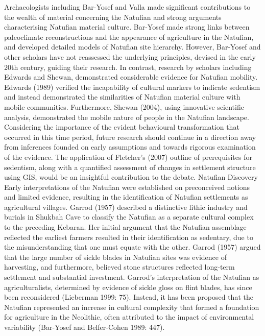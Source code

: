\documentclass[%
	]{ijsra}
\begin{document}
Archaeologists including Bar-Yosef and Valla made significant contributions to the wealth of material concerning the Natufian and strong arguments characterising Natufian material culture. Bar-Yosef made strong links between paleoclimate reconstructions and the appearance of agriculture in the Natufian, and developed detailed models of Natufian site hierarchy. However, Bar-Yosef and other scholars have not reassessed the underlying principles, devised in the early 20th century, guiding their research. In contrast, research by scholars including Edwards and Shewan, demonstrated considerable evidence for Natufian mobility. Edwards (1989) verified the incapability of cultural markers to indicate sedentism and instead demonstrated the similarities of Natufian material culture with mobile communities. Furthermore, Shewan (2004), using innovative scientific analysis, demonstrated the mobile nature of people in the Natufian landscape. Considering the importance of the evident behavioural transformation that occurred in this time period, future research should continue in a direction away from inferences founded on early assumptions and towards rigorous examination of the evidence. The application of Fletcher’s (2007) outline of prerequisites for sedentism, along with a quantified assessment of changes in settlement structure using GIS, would be an insightful contribution to the debate.
Natufian Discovery 
Early interpretations of the Natufian were established on preconceived notions and limited evidence, resulting in the identification of Natufian settlements as agricultural villages. Garrod (1957) described a distinctive lithic industry and burials in Shukbah Cave to classify the Natufian as a separate cultural complex to the preceding Kebaran. Her initial argument that the Natufian assemblage reflected the earliest farmers resulted in their identification as sedentary, due to the misunderstanding that one must equate with the other. Garrod (1957) argued that the large number of sickle blades in Natufian sites was evidence of harvesting, and furthermore, believed stone structures reflected long-term settlement and substantial investment. Garrod’s interpretation of the Natufian as agriculturalists, determined by evidence of sickle gloss on flint blades, has since been reconsidered (Lieberman 1999: 75). Instead, it has been proposed that the Natufian represented an increase in cultural complexity that formed a foundation for agriculture in the Neolithic, often attributed to the impact of environmental variability (Bar-Yosef and Belfer-Cohen 1989: 447). 
\end{document}
